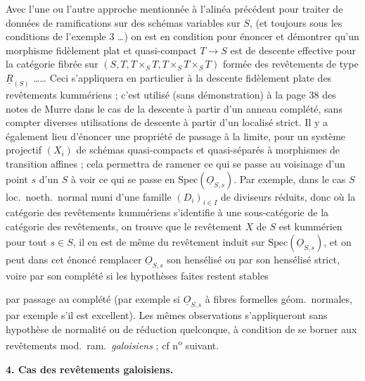\documentclass[11pt,a4paper]{article}
\begin{document}
Avec l'une ou l'autre approche mentionnée à l'alinéa précédent pour traiter de
données de ramifications sur des schémas variables sur $S$, (et toujours sous
les conditions de l'exemple 3 …) on est en condition pour énoncer et
démontrer qu'un morphisme fidèlement plat et quasi-compact $T \to S$ est de
descente effective pour la catégorie fibrée sur
$(S, T, T \times_S T, T \times_S T \times_S T)$ formée des revêtements de type
$\underline{R}_{(S)}$ …… Ceci s'appliquera en particulier à la
descente fidèlement plate des revêtements kummériens ; c'est utilisé (sans
démonstration) à la page 38 des notes de Murre dans le cas de la descente à
partir d'un anneau complété, sans compter diverses utilisations de descente à
partir d'un localisé strict. Il y a également lieu d'énoncer une propriété de
passage à la limite, pour un système projectif $(X_i)$ de schémas
quasi-compacts et quasi-séparés à morphismes de transition affines ; cela
permettra de ramener ce qui se passe au voisinage d'un point $s$ d'un $S$ à
voir ce qui se passe en $\mathrm{Spec}(\underline{O}_{S,s})$. Par exemple, dans
le cas $S$ loc.\ noeth.\ normal muni d'une famille $(D_i)_{i \in I}$ de
diviseurs réduits, donc où la catégorie des revêtements kummériens s'identifie
à une sous-catégorie de la catégorie des revêtements, on trouve que le
revêtement $X$ de $S$ est \struck{\ill{}} kummérien  pour tout
$s \in S$, il en est de même du revêtement induit sur
$\mathrm{Spec}(\underline{O}_{S,s})$, et on peut dans cet énoncé remplacer
$\underline{O}_{S,s}$  son hensélisé ou par son hensélisé strict,
\struck{\ill{}} voire par son complété si les hypothèses faites restent stables

par passage au complété (par exemple si $\underline{O}_{S,s}$ à fibres
formelles géom.\ normales, par exemple s'il est excellent). Les mêmes
observations s'appliqueront sans hypothèse de normalité ou de réduction
quelconque, à condition de se borner aux revêtements
 mod.\ ram.\ \emph{galoisiens} ; cf
n\textsuperscript{o} suivant.

\textbf{4. Cas des revêtements galoisiens.}
\end{document}
